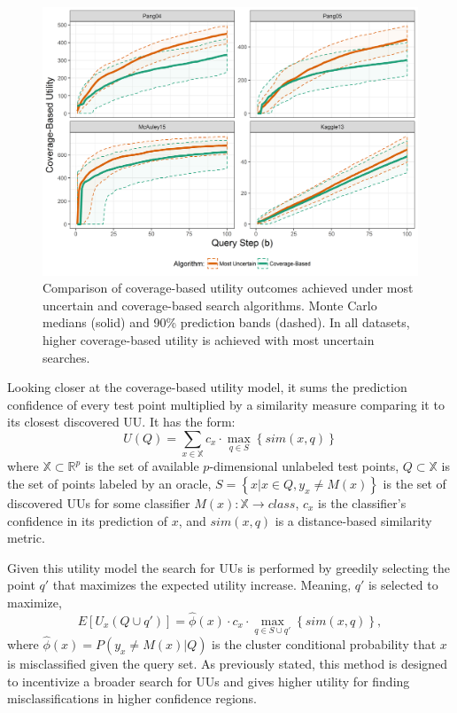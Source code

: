 \documentclass[letterpaper]{article} %
\begin{document}
\begin{figure}[h!]
  \centering
  \includegraphics[width=\textwidth]{CoverageVsMostUncertainPlaceholder.png}
  \caption{Comparison of coverage-based utility outcomes achieved under most uncertain and coverage-based search algorithms. Monte Carlo medians (solid) and 90\% prediction bands (dashed).  In all datasets, higher coverage-based utility is achieved with most uncertain searches.}
  \label{fig:coverutil}
\end{figure}

Looking closer at the coverage-based utility model, it sums the prediction confidence of every test point multiplied by a similarity measure comparing it to its closest discovered UU.  It has the form: $$U(Q) = \sum_{x \in \mathbb{X}} c_x \cdot \max_{q \in S} \left\{sim\left(x,q \right) \right\}$$ where $\mathbb{X} \subset \mathbb{R}^p$ is the set of available $p$-dimensional unlabeled test points, $Q \subset \mathbb{X}$ is the set of points labeled by an oracle, $S = \left\{x|x \in Q, y_x \neq M(x)\right\}$ is the set of discovered UUs for some classifier $M(x):\mathbb{X} \rightarrow class$, $c_x$ is the classifier's confidence in its prediction of $x$, and $sim(x,q)$ is a distance-based similarity metric. 

Given this utility model the search for UUs is performed by greedily selecting the point $q'$ that maximizes the expected utility increase.  Meaning, $q'$ is selected to maximize, $$E\left[U_x\left(Q \cup q'\right)\right] = \hat{\phi}(x) \cdot c_x \cdot \max_{q \in S \cup q'} \left\{sim\left(x,q \right) \right\},$$ where $\hat{\phi}(x) = P\left(y_x \neq M(x) |Q \right)$ is the cluster conditional probability that $x$ is misclassified given the query set.  As previously stated, this method is designed to incentivize a broader search for UUs and gives higher utility for finding misclassifications in higher confidence regions.  
\end{document}
